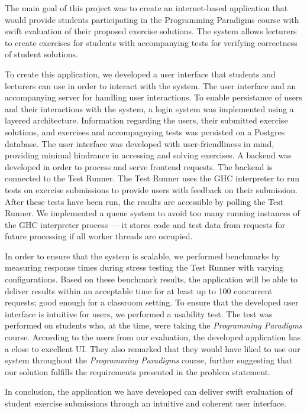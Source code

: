 The main goal of this project was to create an internet-based application that would provide students participating in the Programming Paradigms course with swift evaluation of their proposed exercise solutions.
The system allows lecturers to create exercises for students with accompanying tests for verifying correctness of student solutions.

To create this application, we developed a user interface that students and lecturers can use in order to interact with the system. The user interface and an accompanying server for handling user interactions.
To enable persistance of users and their interactions with the system, a login system was implemented using a layered architecture.
Information regarding the users, their submitted exercise solutions, and exercises and accompagnying tests was persisted on a Postgres database.
The user interface was developed with user-friendliness in mind, providing minimal hindrance in accessing and solving exercises.
A backend was developed in order to process and serve frontend requests.
The backend is connected to the Test Runner. The Test Runner uses the GHC interpreter to run tests on exercise submissions to provide users with feedback on their submission.
After these tests have been run, the results are accessible by polling the Test Runner.
We implemented a queue system to avoid too many running instances of the GHC interpreter process --- it stores code and test data from requests for future processing if all worker threads are occupied.

In order to ensure that the system is scalable, we performed benchmarks by measuring response times during stress testing the Test Runner with varying configurations.
Based on these benchmark results, the application will be able to deliver results within an acceptable time for at least up to 100 concurrent requests; good enough for a classroom setting.
To ensure that the developed user interface is intuitive for users, we performed a usability test.
The test was performed on students who, at the time, were taking the \textit{Programming Paradigms} course.
According to the users from our evaluation, the developed application has a close to excellent UI.
They also remarked that they would have liked to use our system throughout the \textit{Programming Paradigms} course, further suggesting that our solution fulfills the requirements presented in the problem statement.

In conclusion, the application we have developed can deliver swift evaluation of student exercise submissions through an intuitive and coherent user interface.